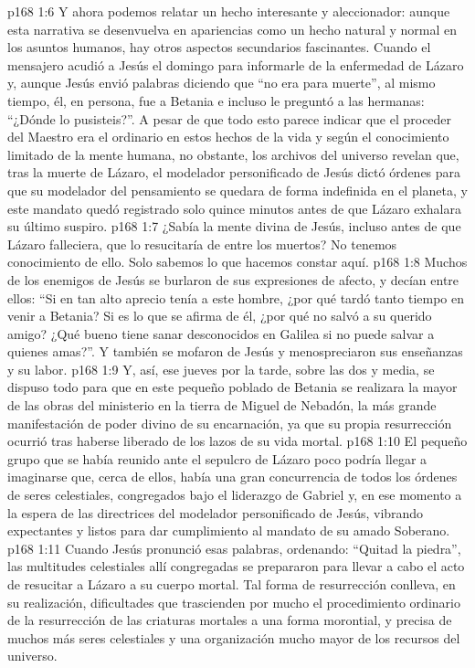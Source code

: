 \vs p168 1:6 \pc Y ahora podemos relatar un hecho interesante y aleccionador: aunque esta narrativa se desenvuelva en apariencias como un hecho natural y normal en los asuntos humanos, hay otros aspectos secundarios fascinantes. Cuando el mensajero acudió a Jesús el domingo para informarle de la enfermedad de Lázaro y, aunque Jesús envió palabras diciendo que “no era para muerte”, al mismo tiempo, él, en persona, fue a Betania e incluso le preguntó a las hermanas: “¿Dónde lo pusisteis?”. A pesar de que todo esto parece indicar que el proceder del Maestro era el ordinario en estos hechos de la vida y según el conocimiento limitado de la mente humana, no obstante, los archivos del universo revelan que, tras la muerte de Lázaro, el modelador personificado de Jesús dictó órdenes para que su modelador del pensamiento se quedara de forma indefinida en el planeta, y este mandato quedó registrado solo quince minutos antes de que Lázaro exhalara su último suspiro.
\vs p168 1:7 ¿Sabía la mente divina de Jesús, incluso antes de que Lázaro falleciera, que lo resucitaría de entre los muertos? No tenemos conocimiento de ello. Solo sabemos lo que hacemos constar aquí.
\vs p168 1:8 \pc Muchos de los enemigos de Jesús se burlaron de sus expresiones de afecto, y decían entre ellos: “Si en tan alto aprecio tenía a este hombre, ¿por qué tardó tanto tiempo en venir a Betania? Si es lo que se afirma de él, ¿por qué no salvó a su querido amigo? ¿Qué bueno tiene sanar desconocidos en Galilea si no puede salvar a quienes amas?”. Y también se mofaron de Jesús y menospreciaron sus enseñanzas y su labor.
\vs p168 1:9 Y, así, ese jueves por la tarde, sobre las dos y media, se dispuso todo para que en este pequeño poblado de Betania se realizara la mayor de las obras del ministerio en la tierra de Miguel de Nebadón, la más grande manifestación de poder divino de su encarnación, ya que su propia resurrección ocurrió tras haberse liberado de los lazos de su vida mortal.
\vs p168 1:10 El pequeño grupo que se había reunido ante el sepulcro de Lázaro poco podría llegar a imaginarse que, cerca de ellos, había una gran concurrencia de todos los órdenes de seres celestiales, congregados bajo el liderazgo de Gabriel y, en ese momento a la espera de las directrices del modelador personificado de Jesús, vibrando expectantes y listos para dar cumplimiento al mandato de su amado Soberano.
\vs p168 1:11 Cuando Jesús pronunció esas palabras, ordenando: “Quitad la piedra”, las multitudes celestiales allí congregadas se prepararon para llevar a cabo el acto de resucitar a Lázaro a su cuerpo mortal. Tal forma de resurrección conlleva, en su realización, dificultades que trascienden por mucho el procedimiento ordinario de la resurrección de las criaturas mortales a una forma morontial, y precisa de muchos más seres celestiales y una organización mucho mayor de los recursos del universo.
